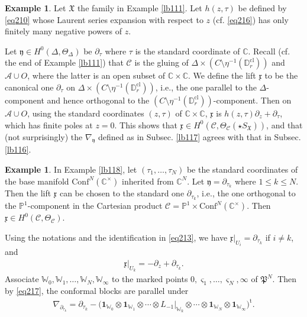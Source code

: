 \documentclass[12pt,a4paper,notitlepage]{article}
\theoremstyle{definition}
\newtheorem{eg}[df]{Example}
\theoremstyle{plain}
\newcommand{\fk}{\mathfrak}
\newcommand{\mc}{\mathcal}
\newcommand{\tr}{\mathrm{t}} %
\newcommand{\id}{\mathbf{1}}
\newcommand{\Conf}{\mathrm{Conf}}
\newcommand{\xk}{\mathfrak x}
\newcommand{\yk}{\mathfrak y}
\newcommand{\sgm}{\varsigma}
\newcommand{\SX}{{S_{\fk X}}}
\newcommand{\Wbb}{\mathbb W}
\newcommand{\Cbb}{\mathbb C}
\newcommand{\Pbb}{\mathbb P}
\newcommand{\Dbb}{\mathbb D}
\newcommand{\cl}{\mathrm{cl}}
\numberwithin{equation}{section}
\begin{document}
\begin{eg}\label{lb148}
Let $\fk X$ the family in Example \ref{lb111}. Let $h(z,\tau)$ be defined by \eqref{eq210} whose Laurent series expansion with respect to $z$ (cf. \eqref{eq216}) has only finitely many negative powers of $z$.  

Let $\yk\in H^0(\Delta,\Theta_\Delta)$ be $\partial_\tau$ where $\tau$ is the standard coordinate of $\Cbb$. Recall (cf. the end of Example \ref{lb111}) that $\mc C$ is the gluing of $\Delta\times(C\setminus\eta^{-1}(\Dbb_r^\cl))$ and $\mc A\cup O$, where the latter is an open subset of $\Cbb\times\Cbb$. We define the lift $\xk$ to be the canonical one $\partial_\tau$ on $\Delta\times(C\setminus\eta^{-1}(\Dbb_r^\cl))$, i.e., the one parallel to the $\Delta$-component  and hence orthogonal to the $(C\setminus\eta^{-1}(\Dbb_r^\cl))$-component. Then on $\mc A\cup O$, using the standard coordinates $(z,\tau)$ of $\Cbb\times\Cbb$, $\xk$ is $h(z,\tau)\partial_z+\partial_\tau$, which has finite poles at $z=0$. This shows that $\xk\in H^0(\mc C,\Theta_{\mc C}(\star\SX))$, and that (not surprisingly) the  $\nabla_\yk$ defined as in Subsec. \ref{lb117} agrees with that in Subsec. \ref{lb116}.  \hfill\qedsymbol
\end{eg}



\begin{eg}\label{lb180}
In Example \ref{lb118}, let $(\tau_1,\dots,\tau_N)$ be the standard coordinates of the base manifold $\Conf^N(\Cbb^\times)$ inherited from $\Cbb^N$. Let $\yk=\partial_{\tau_k}$ where $1\leq k\leq N$. Then the lift $\xk$ can be chosen to the standard one $\partial_{\tau_k}$, i.e., the one orthogonal to the $\Pbb^1$-component in the Cartesian product $\mc C=\Pbb^1\times\Conf^N(\Cbb^\times)$. Then $\xk\in H^0(\mc C,\Theta_{\mc C})$.

Using the notations and the identification in \eqref{eq213}, we have $\xk|_{U_i}=\partial_{\tau_k}$ if $i\neq k$, and
\begin{align}
\xk|_{U_k}=-\partial_z+\partial_{\tau_k}.
\end{align}
Associate $\Wbb_0,\Wbb_1,\dots,\Wbb_N,\Wbb_\infty$ to the marked points $0,\sgm_1,\dots,\sgm_N,\infty$ of $\fk P^N$. Then by \eqref{eq217}, the conformal blocks are parallel under
\begin{align}
\nabla_{\partial_{\tau_k}}=\partial_{\tau_k}-\big(\id_{\Wbb_0}\otimes\id_{\Wbb_1}\otimes\cdots\otimes L_{-1}\big|_{\Wbb_k}\otimes\cdots\otimes\id_{\Wbb_N}\otimes\id_{\Wbb_\infty}\big)^\tr.
\end{align}
\end{eg}
\end{document}
